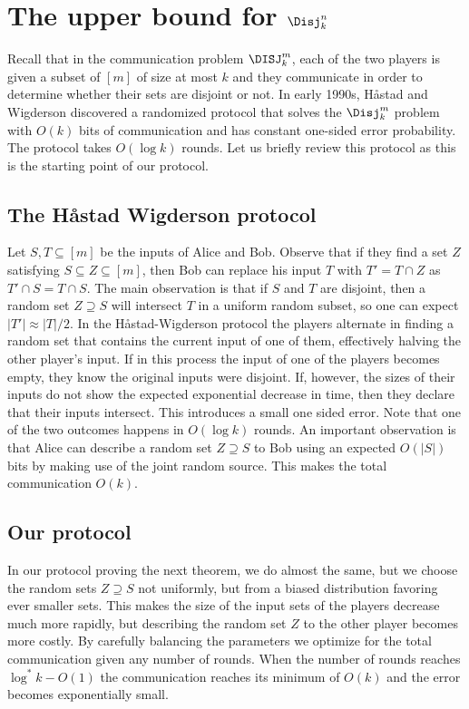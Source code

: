 \section{The upper bound for $\Disj^n_k$}
\label{sec:disj:upperbound}

Recall that in the communication problem $\DISJ_k^m$, each of
the two players is given a subset of $[m]$ of size at most $k$
and they communicate in order to determine whether their sets
are disjoint or not. In early 1990s, Håstad and Wigderson
\cite{ParnafesIRWA1997,HastadW2007, HastadW1990} discovered a
randomized protocol that solves the $\Disj^m_k$ problem with 
$O(k)$ bits of communication and has constant one-sided error 
probability. The protocol takes $O(\log k)$ rounds. 
Let us briefly review this protocol as this
is the starting point of our protocol.

\subsection{The Håstad Wigderson protocol}
Let $S,T\subseteq[m]$ be the inputs of Alice and Bob. Observe
that if they find a set $Z$ satisfying $S\subseteq Z\subseteq
[m]$, then Bob can replace his input $T$ with $T'=T\cap Z$ as
$T'\cap S=T\cap S$. The main observation is that if $S$ and $T$
are disjoint, then a random set $Z\supseteq S$ will intersect
$T$ in a uniform random subset, so one can expect
$|T'|\approx|T|/2$. In the H\aa stad-Wigderson protocol the
players alternate in finding a random set that contains the
current input of one of them, effectively halving the other
player's input. If in this process the input of one of the
players becomes empty, they know the original inputs were
disjoint. If, however, the sizes of their inputs do not show the
expected exponential decrease in time, then they declare that
their inputs intersect. This introduces a small one sided error.
Note that one of the two outcomes happens in $O(\log k)$ rounds.
An important observation is that Alice can describe a random set
$Z\supseteq S$ to Bob using an expected $O(|S|)$ bits by making
use of the joint random source. This makes the total
communication $O(k)$.

\subsection{Our protocol}
\label{sec:disj:upperbound:our}
In our protocol proving the next theorem, we do almost the same,
but we choose the random sets $Z\supseteq S$ not uniformly, but
from a biased distribution favoring ever smaller sets. This
makes the size of the input sets of the players decrease much
more rapidly, but describing the random set $Z$ to the other
player becomes more costly. By carefully balancing the
parameters we optimize for the total communication given any
number of rounds. When the number of rounds reaches
$\log^*k-O(1)$ the communication reaches its minimum of $O(k)$
and the error becomes exponentially small.

